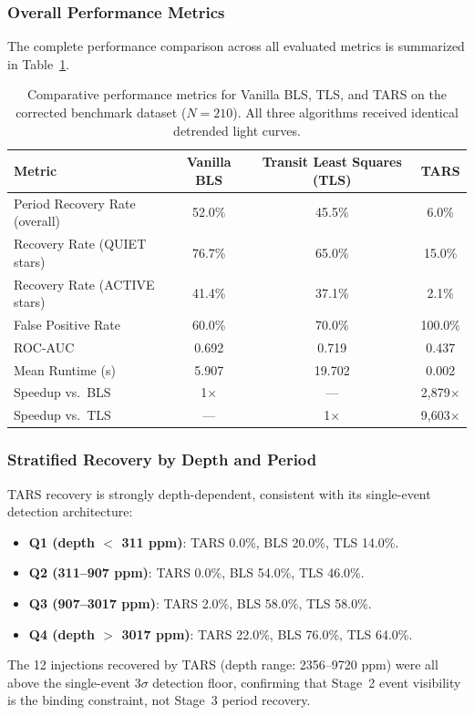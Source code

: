 \subsubsection{Overall Performance Metrics}

The complete performance comparison across all evaluated metrics is summarized in Table~\ref{tab:exp5_comparison}.

\begin{table}[htbp]
\centering
\caption{Comparative performance metrics for Vanilla BLS, TLS, and TARS on the corrected benchmark dataset ($N=210$). All three algorithms received identical detrended light curves.}
\label{tab:exp5_comparison}
\begin{tabular}{lccc}
\hline
\textbf{Metric} & \textbf{Vanilla BLS} & \textbf{Transit Least Squares (TLS)} & \textbf{TARS} \\ \hline
Period Recovery Rate (overall) & 52.0\% & 45.5\% & 6.0\% \\
Recovery Rate (QUIET stars)    & 76.7\% & 65.0\% & 15.0\% \\
Recovery Rate (ACTIVE stars)   & 41.4\% & 37.1\% & 2.1\% \\
False Positive Rate            & 60.0\% & 70.0\% & 100.0\% \\
ROC-AUC                        & 0.692  & 0.719  & 0.437 \\
Mean Runtime (s)               & 5.907  & 19.702 & 0.002 \\
Speedup vs.\ BLS               & 1$\times$ & ---   & 2{,}879$\times$ \\
Speedup vs.\ TLS               & ---   & 1$\times$ & 9{,}603$\times$ \\ \hline
\end{tabular}
\end{table}

\subsubsection{Stratified Recovery by Depth and Period}
TARS recovery is strongly depth-dependent, consistent with its single-event detection architecture:
\begin{itemize}
    \item \textbf{Q1 (depth $<$ 311 ppm)}: TARS 0.0\%, BLS 20.0\%, TLS 14.0\%.
    \item \textbf{Q2 (311--907 ppm)}: TARS 0.0\%, BLS 54.0\%, TLS 46.0\%.
    \item \textbf{Q3 (907--3017 ppm)}: TARS 2.0\%, BLS 58.0\%, TLS 58.0\%.
    \item \textbf{Q4 (depth $>$ 3017 ppm)}: TARS 22.0\%, BLS 76.0\%, TLS 64.0\%.
\end{itemize}
The 12 injections recovered by TARS (depth range: 2356--9720 ppm) were all above the single-event $3\sigma$ detection floor, confirming that Stage~2 event visibility is the binding constraint, not Stage~3 period recovery.

